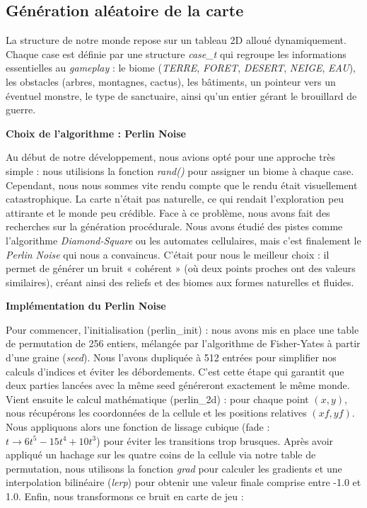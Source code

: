 \documentclass[11pt,a4paper]{article}
\begin{document}
\subsection{Génération aléatoire de la carte}

La structure de notre monde repose sur un tableau 2D alloué dynamiquement. Chaque case est définie par une structure \emph{case\_t} qui regroupe les informations essentielles au \emph{gameplay} : le biome (\emph{TERRE}, \emph{FORET}, \emph{DESERT}, \emph{NEIGE}, \emph{EAU}), les obstacles (arbres, montagnes, cactus), les bâtiments, un pointeur vers un éventuel monstre, le type de sanctuaire, ainsi qu’un entier gérant le brouillard de guerre.

\medskip

\noindent\textbf{Choix de l'algorithme : Perlin Noise}

\noindent Au début de notre développement, nous avions opté pour une approche très simple : nous utilisions la fonction \emph{rand()} pour assigner un biome à chaque case. Cependant, nous nous sommes vite rendu compte que le rendu était visuellement catastrophique. La carte n'était pas naturelle, ce qui rendait l'exploration peu attirante et le monde peu crédible. 
Face à ce problème, nous avons fait des recherches sur la génération procédurale. Nous avons étudié des pistes comme l'algorithme \emph{Diamond-Square} ou les automates cellulaires, mais c'est finalement le \emph{Perlin Noise} qui nous a convaincus. C'était pour nous le meilleur choix : il permet de générer un bruit « cohérent » (où deux points proches ont des valeurs similaires), créant ainsi des reliefs et des biomes aux formes naturelles et fluides.

\medskip

\noindent\textbf{Implémentation du Perlin Noise}

Pour commencer, l'initialisation (perlin\_init) : nous avons mis en place une table de permutation de 256 entiers, mélangée par l'algorithme de Fisher-Yates à partir d'une graine (\emph{seed}). Nous l'avons dupliquée à 512 entrées pour simplifier nos calculs d'indices et éviter les débordements. C'est cette étape qui garantit que deux parties lancées avec la même seed généreront exactement le même monde.
Vient ensuite le calcul mathématique (perlin\_2d) : pour chaque point $(x, y)$, nous récupérons les coordonnées de la cellule et les positions relatives $(xf, yf)$. Nous appliquons alors une fonction de lissage cubique (fade : $t \rightarrow 6t^5 - 15t^4 + 10t^3$) pour éviter les transitions trop brusques. Après avoir appliqué un hachage sur les quatre coins de la cellule via notre table de permutation, nous utilisons la fonction \emph{grad} pour calculer les gradients et une interpolation bilinéaire (\emph{lerp}) pour obtenir une valeur finale comprise entre -1.0 et 1.0.
Enfin, nous transformons ce bruit en carte de jeu :
\end{document}
